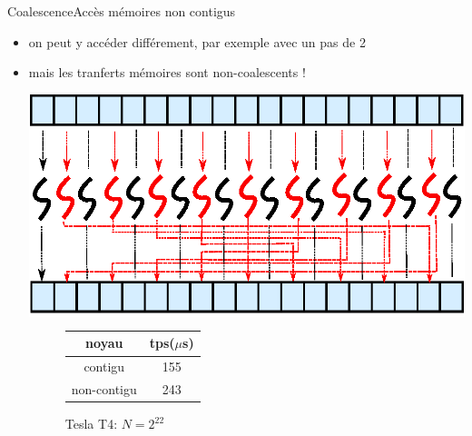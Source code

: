 \documentclass[11pt,mathserif]{beamer}
\newcommand{\kontuz}{\faExclamationTriangle}
\newcommand{\adibi}{\faCommentO}
\newcommand{\extcu}{cu}
\newcommand{\extcu}{cuf}
\newcommand{\includeSrcCu}[1]{}
\begin{document}
\begin{frame}{Coalescence}{Accès mémoires non contigus}
  \begin{itemize}[<+->]
    \item[\adibi] on peut y accéder différement, par exemple avec un pas de 2
\begin{center}
  \includeSrcCu{code/scaleFlipAndHalf}
\end{center}
    \item[\kontuz] mais les tranferts mémoires sont non-coalescents !
\begin{minipage}[c]{0.49\linewidth}
  \colorbox{white}{\includegraphics[width=0.9\linewidth]{fig/coalScaleHalf.eps}}
\end{minipage}
\begin{minipage}[r]{0.49\linewidth}
  \vspace{1cm}
  \begin{figure}[h]
    \begin{tabular}{|c|c|}
      \hline
      noyau & tps($\mu$s)  \\
      \hline
      contigu & 155 \\
      non-contigu  & 243 \\
      \hline
    \end{tabular}
    \caption{Tesla T4: $N = 2^{22}$}
  \end{figure}
\end{minipage}
  \end{itemize}
\end{frame}
\end{document}
